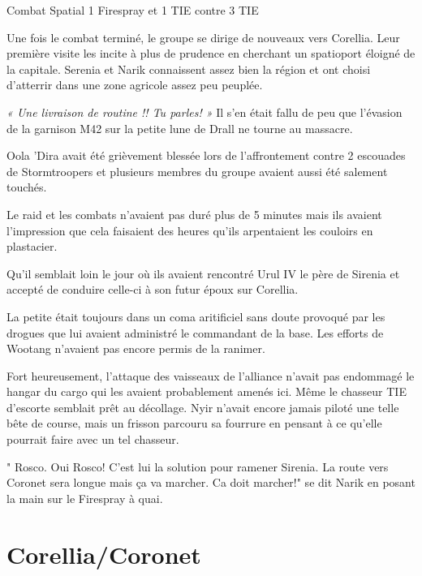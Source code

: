 \documentclass[a4paper,10pt,twoside,twocolumn,openany]{book}
\begin{document}
\begin{commentbox}{Combat Spatial}
1 Firespray et 1 TIE contre 3 TIE
\end{commentbox}

Une fois le combat terminé, le groupe se dirige de nouveaux vers Corellia. Leur première visite
les incite à plus de prudence en cherchant un spatioport éloigné de la capitale. Serenia et Narik
connaissent assez bien la région et ont choisi d’atterrir dans une zone agricole assez peu
peuplée.

\begin{quotebox}

\emph{« Une livraison de routine !! Tu parles! »}
Il s'en était fallu de peu que l'évasion de la garnison M42 sur la petite lune de Drall ne tourne au
massacre.

Oola 'Dira avait été grièvement blessée lors de l'affrontement contre 2 escouades de Stormtroopers et
plusieurs membres du groupe avaient aussi été salement touchés.

Le raid et les combats n'avaient pas duré plus de 5 minutes mais ils avaient l'impression que cela
faisaient des heures qu'ils arpentaient les couloirs en plastacier.

Qu'il semblait loin le jour où ils avaient rencontré Urul IV le père de Sirenia et accepté de conduire
celle-ci à son futur époux sur Corellia.

La petite était toujours dans un coma aritificiel sans doute provoqué par les drogues que lui avaient
administré le commandant de la base. Les efforts de Wootang n'avaient pas encore permis de la
ranimer.

Fort heureusement, l'attaque des vaisseaux de l'alliance n'avait pas endommagé le hangar du cargo qui
les avaient probablement amenés ici. Même le chasseur TIE d'escorte semblait prêt au décollage. Nyir
n’avait encore jamais piloté une telle bête de course, mais un frisson parcouru sa fourrure en pensant à
ce qu'elle pourrait faire avec un tel chasseur.

" Rosco. Oui Rosco! C'est lui la solution pour ramener Sirenia. La route vers Coronet sera longue mais
ça va marcher. Ca doit marcher!" se dit Narik en posant la main sur le Firespray à quai.
\end{quotebox}


\section{Corellia/Coronet}
\end{document}
